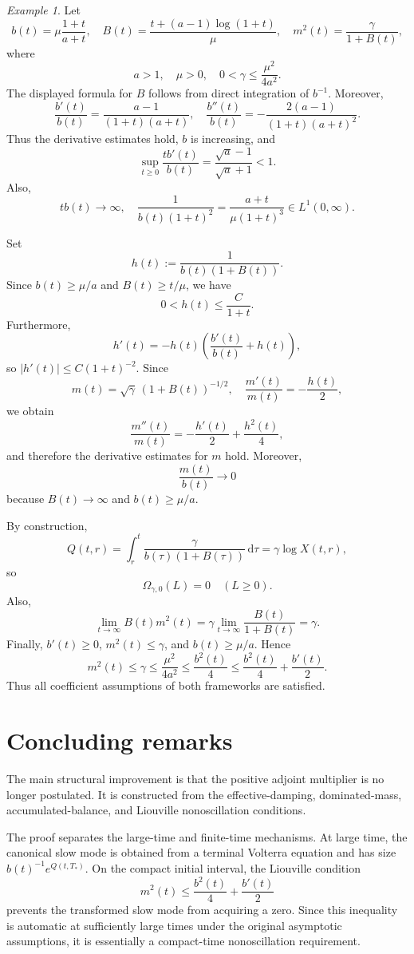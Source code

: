 \documentclass[11pt,reqno]{amsart}
\theoremstyle{definition}
\theoremstyle{remark}
\newtheorem{example}{Example}
\begin{document}
	\begin{example}
		Let
		$$
		b(t)=\mu\frac{1+t}{a+t},
		\quad
		B(t)=\frac{t+(a-1)\log(1+t)}{\mu},
		\quad
		m^2(t)=\frac{\gamma}{1+B(t)},
		$$
		where
		$$
		a>1,
		\quad
		\mu>0,
		\quad
		0<\gamma\leq\frac{\mu^2}{4a^2}.
		$$
		The displayed formula for $B$ follows from direct integration of
		$b^{-1}$. Moreover,
		$$
		\frac{b'(t)}{b(t)}
		=\frac{a-1}{(1+t)(a+t)},
		\quad
		\frac{b''(t)}{b(t)}
		=-\frac{2(a-1)}{(1+t)(a+t)^2}.
		$$
		Thus the derivative estimates hold, $b$ is increasing, and
		$$
		\sup_{t\geq0}\frac{tb'(t)}{b(t)}
		=\frac{\sqrt a-1}{\sqrt a+1}<1.
		$$
		Also,
		$$
		tb(t)\longrightarrow\infty,
		\quad
		\frac{1}{b(t)(1+t)^2}
		=\frac{a+t}{\mu(1+t)^3}\in L^1(0,\infty).
		$$
		
		Set
		$$
		h(t):=\frac{1}{b(t)(1+B(t))}.
		$$
		Since $b(t)\geq\mu/a$ and $B(t)\geq t/\mu$, we have
		$$
		0<h(t)\leq\frac{C}{1+t}.
		$$
		Furthermore,
		$$
		h'(t)=-h(t)\left(\frac{b'(t)}{b(t)}+h(t)\right),
		$$
		so $|h'(t)|\leq C(1+t)^{-2}$. Since
		$$
		m(t)=\sqrt\gamma\,(1+B(t))^{-1/2},
		\quad
		\frac{m'(t)}{m(t)}=-\frac{h(t)}2,
		$$
		we obtain
		$$
		\frac{m''(t)}{m(t)}
		=-\frac{h'(t)}2+\frac{h^2(t)}4,
		$$
		and therefore the derivative estimates for $m$ hold. Moreover,
		$$
		\frac{m(t)}{b(t)}\longrightarrow0
		$$
		because $B(t)\to\infty$ and $b(t)\geq\mu/a$.
		
		By construction,
		$$
		Q(t,r)
		=\int_r^t\frac{\gamma}{b(\tau)(1+B(\tau))}\,\mathrm d\tau
		=\gamma\log X(t,r),
		$$
		so
		$$
		\Omega_{\gamma,0}(L)=0
		\quad(L\geq0).
		$$
		Also,
		$$
		\lim_{t\to\infty}B(t)m^2(t)
		=\gamma\lim_{t\to\infty}\frac{B(t)}{1+B(t)}=\gamma.
		$$
		Finally, $b'(t)\geq0$, $m^2(t)\leq\gamma$, and
		$b(t)\geq\mu/a$. Hence
		$$
		m^2(t)\leq\gamma
		\leq\frac{\mu^2}{4a^2}
		\leq\frac{b^2(t)}4
		\leq\frac{b^2(t)}4+\frac{b'(t)}2.
		$$
		Thus all coefficient assumptions of both frameworks are satisfied.
	\end{example}
	
	\section{Concluding remarks} \label{sec:conclusion}
	
	The main structural improvement is that the positive adjoint multiplier is no longer postulated. It is constructed from the effective-damping, dominated-mass, accumulated-balance, and Liouville nonoscillation conditions.
	
	The proof separates the large-time and finite-time mechanisms. At large time, the canonical slow mode is obtained from a terminal Volterra equation and has size $b(t)^{-1}e^{Q(t,T_*)}$. On the compact initial interval, the Liouville condition
	$$
	m^2(t)\leq\frac{b^2(t)}4+\frac{b'(t)}2
	$$
	prevents the transformed slow mode from acquiring a zero. Since this inequality is automatic at sufficiently large times under the original asymptotic assumptions, it is essentially a compact-time nonoscillation requirement.
	
\end{document}
